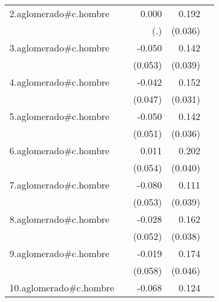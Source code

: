 {\begin{longtable}{l*{4}{D{.}{.}{-1}}}
\addlinespace
2.aglomerado#c.hombre&                     &       0.000         &       0.192\sym{***}&                     \\
            &                     &         (.)         &     (0.036)         &                     \\
\addlinespace
3.aglomerado#c.hombre&                     &      -0.050         &       0.142\sym{***}&                     \\
            &                     &     (0.053)         &     (0.039)         &                     \\
\addlinespace
4.aglomerado#c.hombre&                     &      -0.042         &       0.152\sym{***}&                     \\
            &                     &     (0.047)         &     (0.031)         &                     \\
\addlinespace
5.aglomerado#c.hombre&                     &      -0.050         &       0.142\sym{***}&                     \\
            &                     &     (0.051)         &     (0.036)         &                     \\
\addlinespace
6.aglomerado#c.hombre&                     &       0.011         &       0.202\sym{***}&                     \\
            &                     &     (0.054)         &     (0.040)         &                     \\
\addlinespace
7.aglomerado#c.hombre&                     &      -0.080         &       0.111\sym{**} &                     \\
            &                     &     (0.053)         &     (0.039)         &                     \\
\addlinespace
8.aglomerado#c.hombre&                     &      -0.028         &       0.162\sym{***}&                     \\
            &                     &     (0.052)         &     (0.038)         &                     \\
\addlinespace
9.aglomerado#c.hombre&                     &      -0.019         &       0.174\sym{***}&                     \\
            &                     &     (0.058)         &     (0.046)         &                     \\
\addlinespace
10.aglomerado#c.hombre&                     &      -0.068         &       0.124\sym{***}&                     \\

\end{longtable}}
